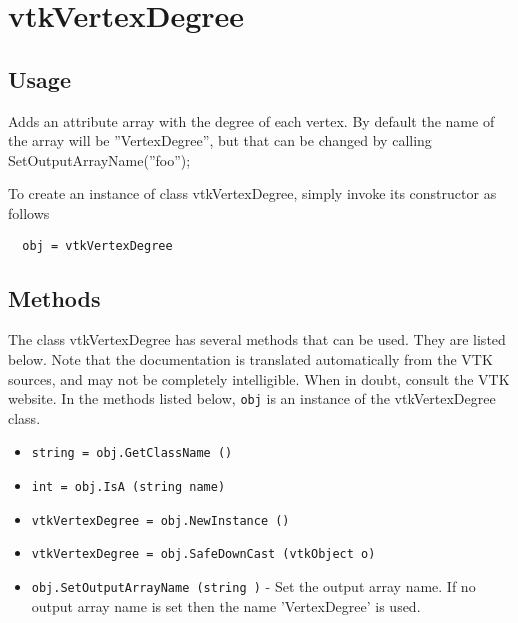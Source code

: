 \section{vtkVertexDegree}

\subsection{Usage}

 Adds an attribute array with the degree of each vertex. By default the name
 of the array will be ''VertexDegree'', but that can be changed by calling
 SetOutputArrayName(''foo'');

To create an instance of class vtkVertexDegree, simply
invoke its constructor as follows
\begin{verbatim}
  obj = vtkVertexDegree
\end{verbatim}
\subsection{Methods}

The class vtkVertexDegree has several methods that can be used.
  They are listed below.
Note that the documentation is translated automatically from the VTK sources,
and may not be completely intelligible.  When in doubt, consult the VTK website.
In the methods listed below, \verb|obj| is an instance of the vtkVertexDegree class.
\begin{itemize}
\item  \verb|string = obj.GetClassName ()|

\item  \verb|int = obj.IsA (string name)|

\item  \verb|vtkVertexDegree = obj.NewInstance ()|

\item  \verb|vtkVertexDegree = obj.SafeDownCast (vtkObject o)|

\item  \verb|obj.SetOutputArrayName (string )| -  Set the output array name. If no output array name is
 set then the name 'VertexDegree' is used.

\end{itemize}
